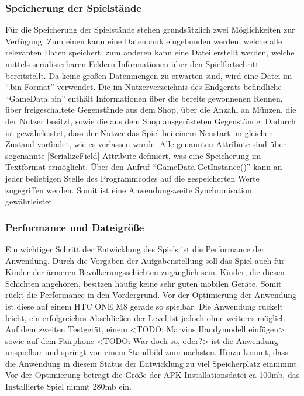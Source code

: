 	\subsubsection{Speicherung der Spielstände\label{speicherung}}
	Für die Speicherung der Spielstände stehen grundsätzlich zwei Möglichkeiten zur Verfügung. Zum einen kann eine Datenbank eingebunden werden, welche alle relevanten Daten speichert, zum anderen kann eine Datei erstellt werden, welche mittels serialisierbaren Feldern Informationen über den Spielfortschritt bereitstellt.
	Da keine großen Datenmengen zu erwarten sind, wird eine Datei im \enquote{.bin Format} verwendet. 
	Die im Nutzerverzeichnis des Endgeräts befindliche \enquote{GameData.bin} enthält Informationen über die bereits gewonnenen Rennen, über freigeschaltete Gegenstände aus dem Shop, über die Anzahl an Münzen, die der Nutzer besitzt, sowie die aus dem Shop ausgerüsteten Gegenstände. Dadurch ist gewährleistet, dass der Nutzer das Spiel bei einem Neustart im gleichen Zustand vorfindet, wie es verlassen wurde. 
	Alle genannten Attribute sind über sogenannte [SerializeField] Attribute definiert, was eine Speicherung im Textformat ermöglicht. Über den Aufruf \enquote{GameData.GetInstance()} kann an jeder beliebigen Stelle des Programmcodes auf die gespeicherten Werte zugegriffen werden. Somit ist eine Anwendungsweite Synchronisation gewährleistet.

	\subsubsection{Performance und Dateigröße}
	Ein wichtiger Schritt der Entwicklung des Spiels ist die Performance der Anwendung. Durch die Vorgaben der Aufgabenstellung soll das Spiel auch für Kinder der ärmeren Bevölkerungsschichten zugänglich sein. Kinder, die diesen Schichten angehören, besitzen häufig keine sehr guten mobilen Geräte. Somit rückt die Performance in den Vordergrund.
	Vor der Optimierung der Anwendung ist diese auf einem HTC ONE M8 gerade so spielbar. Die Anwendung ruckelt leicht, ein erfolgreiches Abschließen der Level ist jedoch ohne weiteres möglich. Auf dem zweiten Testgerät, einem <TODO: Marvins Handymodell einfügen> sowie auf dem Fairphone <TODO: War doch so, oder?> ist die Anwendung unspielbar und springt von einem Standbild zum nächsten.
	Hinzu kommt, dass die Anwendung in diesem Status der Entwicklung zu viel Speicherplatz einnimmt. Vor der Optimierung beträgt die Größe der APK-Installationsdatei ca 100mb, das Installierte Spiel nimmt 280mb ein. 

